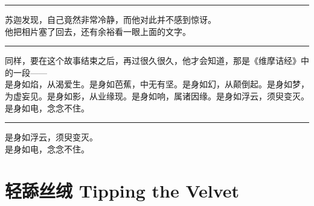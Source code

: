 \documentclass[oneside,11pt]{memoir} %
\begin{document}
\begin{CJK}{UTF8}{gbsn}
\rule{-3pt}{30pt}
    苏迦发现，自己竟然非常冷静，而他对此并不感到惊讶。\\\indent
    他把相片塞了回去，还有余裕看一眼上面的文字。\\\indent
\rule{-3pt}{30pt}
    同样，要在这个故事结束之后，再过很久很久，他才会知道，那是《维摩诘经》中的一段——\\\indent
    是身如焰，从渴爱生。是身如芭蕉，中无有坚。是身如幻，从颠倒起。是身如梦，为虚妄见。是身如影，从业缘现。是身如响，属诸因缘。是身如浮云，须臾变灭。是身如电，念念不住。\\\indent
\rule{-3pt}{30pt}
    是身如浮云，须臾变灭。\\\indent
    是身如电，念念不住。\\\indent

\newpage
\chapter{轻舔丝绒    Tipping the Velvet}
\newpage

\end{CJK}
\end{document}
